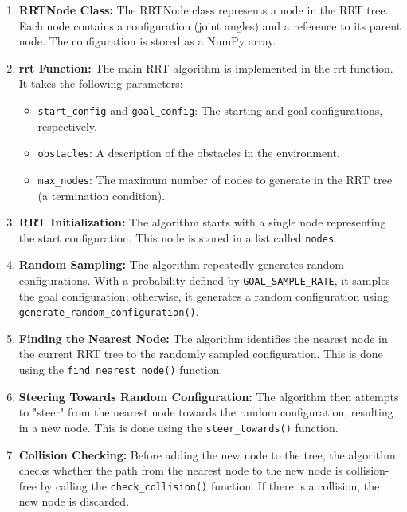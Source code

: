 \documentclass{article}
\begin{document}
\begin{enumerate}
    \item \textbf{RRTNode Class:} The RRTNode class represents a node in the RRT tree. Each node contains a configuration (joint angles) and a reference to its parent node. The configuration is stored as a NumPy array.

    \item \textbf{rrt Function:} The main RRT algorithm is implemented in the rrt function. It takes the following parameters:
    
        \begin{itemize}
            \item \texttt{start\_config} and \texttt{goal\_config}: The starting and goal configurations, respectively.
            \item \texttt{obstacles}: A description of the obstacles in the environment.
            \item \texttt{max\_nodes}: The maximum number of nodes to generate in the RRT tree (a termination condition).
        \end{itemize}
    
    \item \textbf{RRT Initialization:} The algorithm starts with a single node representing the start configuration. This node is stored in a list called \texttt{nodes}.

    \item \textbf{Random Sampling:} The algorithm repeatedly generates random configurations. With a probability defined by \texttt{GOAL\_SAMPLE\_RATE}, it samples the goal configuration; otherwise, it generates a random configuration using \texttt{generate\_random\_configuration()}.

    \item \textbf{Finding the Nearest Node:} The algorithm identifies the nearest node in the current RRT tree to the randomly sampled configuration. This is done using the \texttt{find\_nearest\_node()} function.

    \item \textbf{Steering Towards Random Configuration:} The algorithm then attempts to "steer" from the nearest node towards the random configuration, resulting in a new node. This is done using the \texttt{steer\_towards()} function.

    \item \textbf{Collision Checking:} Before adding the new node to the tree, the algorithm checks whether the path from the nearest node to the new node is collision-free by calling the \texttt{check\_collision()} function. If there is a collision, the new node is discarded.


\end{enumerate}
\end{document}
